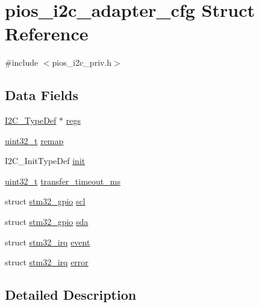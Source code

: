 \hypertarget{structpios__i2c__adapter__cfg}{\section{pios\-\_\-i2c\-\_\-adapter\-\_\-cfg Struct Reference}
\label{structpios__i2c__adapter__cfg}
}


{\ttfamily \#include $<$pios\-\_\-i2c\-\_\-priv.\-h$>$}

\subsection*{Data Fields}
\begin{DoxyCompactItemize}
\item 
\hyperlink{struct_i2_c___type_def}{I2\-C\-\_\-\-Type\-Def} $\ast$ \hyperlink{structpios__i2c__adapter__cfg_af657d3f333ba35a0c78315381851f748}{regs}
\item 
\hyperlink{stdint_8h_a435d1572bf3f880d55459d9805097f62}{uint32\-\_\-t} \hyperlink{structpios__i2c__adapter__cfg_a64d54eb4eb6d9aa0111e3f677afc37ba}{remap}
\item 
I2\-C\-\_\-\-Init\-Type\-Def \hyperlink{structpios__i2c__adapter__cfg_a7c0f3d2e295cc0583245ad41d61e33fe}{init}
\item 
\hyperlink{stdint_8h_a435d1572bf3f880d55459d9805097f62}{uint32\-\_\-t} \hyperlink{structpios__i2c__adapter__cfg_a97b5a8ff68686286ba5f86dda188eb01}{transfer\-\_\-timeout\-\_\-ms}
\item 
struct \hyperlink{structstm32__gpio}{stm32\-\_\-gpio} \hyperlink{structpios__i2c__adapter__cfg_a900bd610a99f0518997e6e2564ef15c7}{scl}
\item 
struct \hyperlink{structstm32__gpio}{stm32\-\_\-gpio} \hyperlink{structpios__i2c__adapter__cfg_a429bb7d5f0918ade96becff15a633875}{sda}
\item 
struct \hyperlink{structstm32__irq}{stm32\-\_\-irq} \hyperlink{structpios__i2c__adapter__cfg_acdad71da492ab5d4582a5b03cd7d1ab2}{event}
\item 
struct \hyperlink{structstm32__irq}{stm32\-\_\-irq} \hyperlink{structpios__i2c__adapter__cfg_a5e418625b07806a90c8f5a55cc1165eb}{error}
\end{DoxyCompactItemize}


\subsection{Detailed Description}



